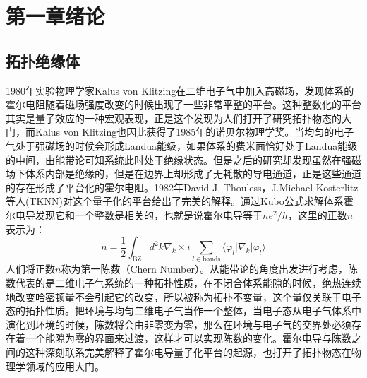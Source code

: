 \section{第一章\quad 绪论}
\setcounter{page}{1}%
\subsection{拓扑绝缘体}
1980年实验物理学家Kalus von Klitzing在二维电子气中加入高磁场，发现体系的霍尔电阻随着磁场强度改变的时候出现了一些非常平整的平台\cite{re1}。这种整数化的平台其实是量子效应的一种宏观表现，正是这个发现为人们打开了研究拓扑物态的大门，而Kalus von Klitzing也因此获得了1985年的诺贝尔物理学奖。当均匀的电子气处于强磁场的时候会形成Landua能级，如果体系的费米面恰好处于Landua能级的中间，由能带论可知系统此时处于绝缘状态。但是之后的研究却发现虽然在强磁场下体系内部是绝缘的，但是在边界上却形成了无耗散的导电通道，正是这些通道的存在形成了平台化的霍尔电阻。1982年David J. Thouless，J.Michael Kosterlitz等人(TKNN)对这个量子化的平台给出了完美的解释\cite{re2}。通过Kubo公式求解体系霍尔电导发现它和一个整数是相关的，也就是说霍尔电导等于$ne^2/h$，这里的正数$n$表示为：
\begin{equation}	
n=\frac{1}{2}\int_{\mathrm{BZ}}d^2k\nabla_k\times i\sum_{l\in\mathrm{bands}}\langle\varphi_l|\nabla_k|\varphi_l\rangle\label{chern_num}
\end{equation}
人们将正数$n$称为第一陈数（Chern Number）。从能带论的角度出发进行考虑，陈数代表的是二维电子气系统的一种拓扑性质，在不闭合体系能隙的时候，绝热连续地改变哈密顿量不会引起它的改变，所以被称为拓扑不变量，这个量仅关联于电子态的拓扑性质。把环境与均匀二维电子气当作一个整体，当电子态从电子气体系中演化到环境的时候，陈数将会由非零变为零，那么在环境与电子气的交界处必须存在着一个能隙为零的界面来过渡，这样才可以实现陈数的变化。霍尔电导与陈数之间的这种深刻联系完美解释了霍尔电导量子化平台的起源，也打开了拓扑物态在物理学领域的应用大门。
